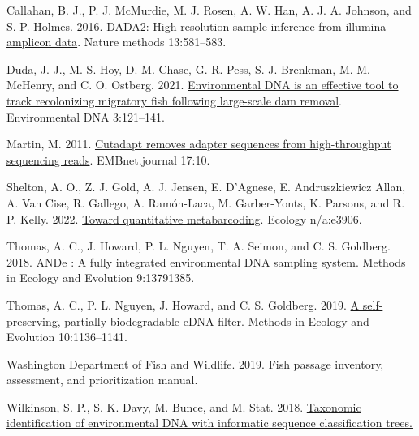 \documentclass[
]{article}
\newlength{\cslhangindent}
\newlength{\cslentryspacingunit} %
\newenvironment{CSLReferences}[2] %
 {%
  \setlength{\parindent}{0pt}
  \ifodd #1
  \let\oldpar\par
  \def\par{\hangindent=\cslhangindent\oldpar}
  \fi
  \setlength{\parskip}{#2\cslentryspacingunit}
 }%
 {}
\begin{document}
\hypertarget{refs}{}
\begin{CSLReferences}{1}{0}
\leavevmode{}%
Callahan, B. J., P. J. McMurdie, M. J. Rosen, A. W. Han, A. J. A.
Johnson, and S. P. Holmes. 2016.
\href{https://doi.org/10.1038/nmeth.3869}{DADA2: High resolution sample
inference from illumina amplicon data}. Nature methods 13:581--583.

\leavevmode{}%
Duda, J. J., M. S. Hoy, D. M. Chase, G. R. Pess, S. J. Brenkman, M. M.
McHenry, and C. O. Ostberg. 2021.
\href{https://doi.org/10.1002/edn3.134}{Environmental DNA is an
effective tool to track recolonizing migratory fish following
large-scale dam removal}. Environmental DNA 3:121--141.

\leavevmode{}%
Martin, M. 2011. \href{https://doi.org/10.14806/ej.17.1.200}{Cutadapt
removes adapter sequences from high-throughput sequencing reads}.
EMBnet.journal 17:10.

\leavevmode{}%
Shelton, A. O., Z. J. Gold, A. J. Jensen, E. D'Agnese, E. Andruszkiewicz
Allan, A. Van Cise, R. Gallego, A. Ramón-Laca, M. Garber-Yonts, K.
Parsons, and R. P. Kelly. 2022.
\href{https://doi.org/10.1002/ecy.3906}{Toward quantitative
metabarcoding}. Ecology n/a:e3906.

\leavevmode{}%
Thomas, A. C., J. Howard, P. L. Nguyen, T. A. Seimon, and C. S.
Goldberg. 2018. ANDe {\texttrademark}: A fully integrated environmental
DNA sampling system. Methods in Ecology and Evolution 9:13791385.

\leavevmode{}%
Thomas, A. C., P. L. Nguyen, J. Howard, and C. S. Goldberg. 2019.
\href{https://doi.org/10.1111/2041-210X.13212}{A self-preserving,
partially biodegradable eDNA filter}. Methods in Ecology and Evolution
10:1136--1141.

\leavevmode{}%
Washington Department of Fish and Wildlife. 2019. Fish passage
inventory, assessment, and prioritization manual.

\leavevmode{}%
Wilkinson, S. P., S. K. Davy, M. Bunce, and M. Stat. 2018.
\href{https://doi.org/10.7287/peerj.preprints.26812v1}{Taxonomic
identification of environmental DNA with informatic sequence
classification trees.}

\end{CSLReferences}
\end{document}
